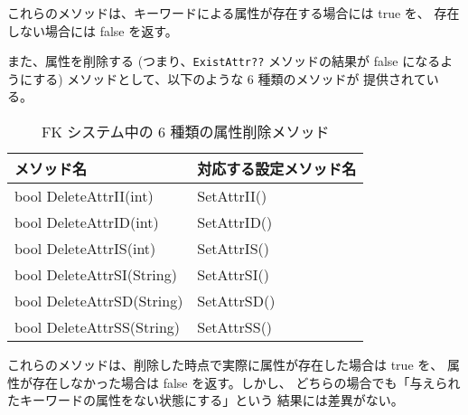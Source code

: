 これらのメソッドは、キーワードによる属性が存在する場合には true を、
存在しない場合には false を返す。

また、属性を削除する (つまり、\verb+ExistAttr??+ メソッドの結果が
false になるようにする) メソッドとして、以下のような 6 種類のメソッドが
提供されている。

\begin{table}[H]
\caption{FK システム中の 6 種類の属性削除メソッド}
\label{tbl:attr4}
\begin{center}
\begin{tabular}{|l|l|}
\hline
メソッド名 & 対応する設定メソッド名 \\ \hline
bool DeleteAttrII(int)		& SetAttrII()	\\ \hline
bool DeleteAttrID(int)		& SetAttrID()	\\ \hline
bool DeleteAttrIS(int)		& SetAttrIS()	\\ \hline
bool DeleteAttrSI(String)	& SetAttrSI()	\\ \hline
bool DeleteAttrSD(String)	& SetAttrSD()	\\ \hline
bool DeleteAttrSS(String)	& SetAttrSS()	\\ \hline
\end{tabular}
\end{center}
\end{table}

これらのメソッドは、削除した時点で実際に属性が存在した場合は true を、
属性が存在しなかった場合は false を返す。しかし、
どちらの場合でも「与えられたキーワードの属性をない状態にする」という
結果には差異がない。
